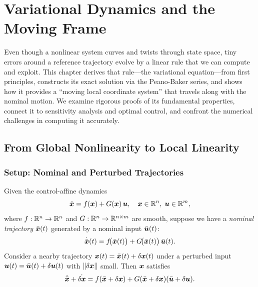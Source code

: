 \chapter{Variational Dynamics and the Moving Frame}
\label{ch:variational}

\begin{laymansbox}
Even though a nonlinear system curves and twists through state space, tiny errors around
a reference trajectory evolve by a linear rule that we can compute and exploit. This
chapter derives that rule---the variational equation---from first principles, constructs its
exact solution via the Peano-Baker series, and shows how it provides a ``moving local
coordinate system'' that travels along with the nominal motion. We examine rigorous proofs
of its fundamental properties, connect it to sensitivity analysis and optimal control, and
confront the numerical challenges in computing it accurately.
\end{laymansbox}

\section{From Global Nonlinearity to Local Linearity}

\subsection{Setup: Nominal and Perturbed Trajectories}

Given the control-affine dynamics
\begin{equation}
\dot{\bm{x}} = f(\bm{x}) + G(\bm{x})\,\bm{u}, \quad \bm{x}\in\mathbb{R}^n,\;\bm{u}\in\mathbb{R}^m,
\label{eq:ch2:affine}
\end{equation}
where $f:\mathbb{R}^n\to\mathbb{R}^n$ and $G:\mathbb{R}^n\to\mathbb{R}^{n\times m}$ are smooth, suppose we have a
\emph{nominal trajectory} $\bar{\bm{x}}(t)$ generated by a nominal input $\bar{\bm{u}}(t)$:
\begin{equation}
\dot{\bar{\bm{x}}}(t) = f\!\bigl(\bar{\bm{x}}(t)\bigr) + G\!\bigl(\bar{\bm{x}}(t)\bigr)\,\bar{\bm{u}}(t).
\label{eq:ch2:nominal}
\end{equation}
Consider a nearby trajectory $\bm{x}(t) = \bar{\bm{x}}(t) + \delta\bm{x}(t)$ under a perturbed input
$\bm{u}(t) = \bar{\bm{u}}(t) + \delta\bm{u}(t)$ with $\|\delta\bm{x}\|$ small. Then $\bm{x}$ satisfies
\begin{equation}
\dot{\bar{\bm{x}}} + \dot{\delta\bm{x}}
= f(\bar{\bm{x}}+\delta\bm{x}) + G(\bar{\bm{x}}+\delta\bm{x})(\bar{\bm{u}}+\delta\bm{u}).
\label{eq:ch2:perturbed}
\end{equation}

